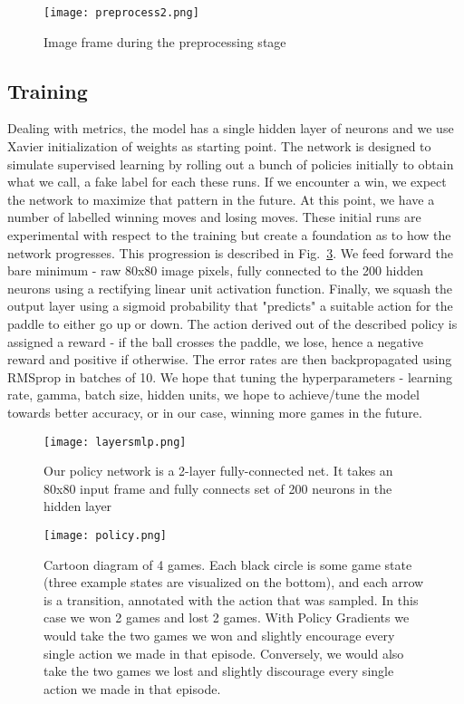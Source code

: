 \documentclass[%
 aip,
 jmp,%
 amsmath,amssymb,
 reprint,%
]{revtex4-1}
\begin{document}
\begin{figure}[h]
\texttt{[image: preprocess2.png]}
\caption{Image frame during the preprocessing stage}
\label{fig:preprocess2}
\end{figure}
\FloatBarrier

\subsection{Training}

Dealing with metrics, the model has a single hidden layer of neurons and we use Xavier initialization of weights as starting point. The network is designed to simulate supervised learning by rolling out a bunch of policies initially to obtain what we call, a fake label for each these runs. If we encounter a win, we expect the network to maximize that pattern in the future. At this point, we have a number of labelled winning moves and losing moves. These initial runs are experimental with respect to the training but create a foundation as to how the network progresses. This progression is described in Fig.~\ref{fig:policy}. We feed forward the bare minimum - raw 80x80 image pixels, fully connected to the 200 hidden neurons using a rectifying linear unit activation function. Finally, we squash the output layer using a sigmoid probability that "predicts" a suitable action for the paddle to either go up or down. The action derived out of the described policy is assigned a reward - if the ball crosses the paddle, we lose, hence a negative reward and positive if otherwise. The error rates are then backpropagated using RMSprop in batches of 10. We hope that tuning the hyperparameters - learning rate, gamma, batch size, hidden units, we hope to achieve/tune the model towards better accuracy, or in our case, winning more games in the future. 

\begin{figure}[h]
\texttt{[image: layersmlp.png]}
\caption{Our policy network is a 2-layer fully-connected net. It takes an 80x80 input frame and fully connects set of 200 neurons in the hidden layer}
\label{fig:mlp}
\end{figure}

\begin{figure}[h]
\texttt{[image: policy.png]}
\caption{Cartoon diagram of 4 games. Each black circle is some game state (three example states are visualized on the bottom), and each arrow is a transition, annotated with the action that was sampled. In this case we won 2 games and lost 2 games. With Policy Gradients we would take the two games we won and slightly encourage every single action we made in that episode. Conversely, we would also take the two games we lost and slightly discourage every single action we made in that episode.}
\label{fig:policy}
\end{figure}
\end{document}
